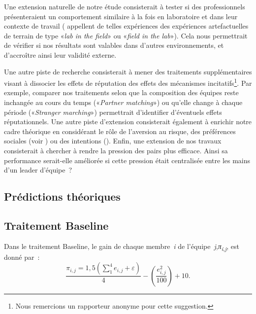 \begin{Article}
\begin{refsection}[Lebourges]
Une extension naturelle de notre étude consisterait à tester si des
professionnels présenteraient un comportement similaire à la fois en
laboratoire et dans leur contexte de travail (\textcite{HarrisonList2004} appellent de telles expériences des expériences
artefactuelles de terrain de type «\emph{lab in the field}» ou
«\emph{field in the lab}»). Cela nous permettrait de vérifier si nos
résultats sont valables dans d'autres environnements, et d'accroître
ainsi leur validité externe.

Une autre piste de recherche consisterait à mener des traitements
supplémentaires visant à dissocier les effets de réputation des effets
des mécanismes incitatifs\footnote{Nous remercions un rapporteur
  anonyme pour cette suggestion.}. Par exemple, comparer nos traitements
selon que la composition des équipes reste inchangée au cours du temps
(«\emph{Partner matching}») ou qu'elle change à chaque période
(«\emph{Stranger marching}») permettrait d'identifier d'éventuels
effets réputationnels. Une autre piste d'extension consisterait
également à enrichir notre cadre théorique en considérant le rôle de
l'aversion au risque, des préférences sociales (voir \textcite{FehrSchmidt1999}) ou des intentions (\textcite{Rabin1993}). Enfin, une extension
de nos travaux consisterait à chercher à rendre la pression des pairs
plus efficace. Ainsi sa performance serait-elle améliorée si cette
pression était centralisée entre les mains d'un leader d'équipe~?

{\sloppy %
\printbibliography
}

\newpage

\begin{appendices}


\section{Prédictions théoriques}
\label{Annexe:Prédictions}

\subsection{Traitement Baseline}
\label{Annexe:Traitement Baseline}

\vspace{0,3cm}
Dans le traitement Baseline, le gain de chaque membre~\emph{i} de
l'équipe~\emph{j},\emph{π\textsubscript{i}}\textsubscript{,\emph{j}},
est donné par~:
\begin{equation}
    \frac{\pi_{i,j} = 1,5\left( \sum_{1}^{4}e_{i,j} + \varepsilon \right)}{4} - \left( \frac{e_{i,j}^{2}}{100} \right) + 10.
\end{equation}


\end{appendices}
\end{refsection}
\end{Article}

